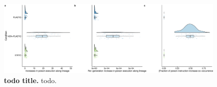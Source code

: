 \begin{figure}[h!]
    \centering
    \includegraphics[width=1.0\textwidth]{media/poison-accumulation-panel.pdf}
    \caption{\small
    \textbf{todo title.}
    todo.
    }
    \label{fig:deleterious-hitchhiking}
\end{figure}